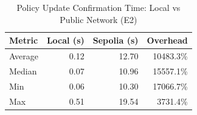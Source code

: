 \begin{table}[h]
\centering
\caption{Policy Update Confirmation Time: Local vs Public Network (E2)}
\label{tab:e2-policy}
\begin{tabular}{lrrr}
\toprule
\textbf{Metric} & \textbf{Local (s)} & \textbf{Sepolia (s)} & \textbf{Overhead} \\
\midrule
Average & 0.12 & 12.70 & 10483.3\% \\
Median & 0.07 & 10.96 & 15557.1\% \\
Min & 0.06 & 10.30 & 17066.7\% \\
Max & 0.51 & 19.54 & 3731.4\% \\
\bottomrule
\end{tabular}
\end{table}
